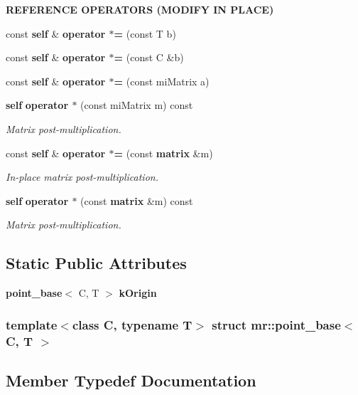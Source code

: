 \begin{Indent}{\bf REFERENCE OPERATORS (MODIFY IN PLACE)}\par
\begin{CompactItemize}
\item 
const {\bf self} \& {\bf operator $\ast$=} (const T b)
\item 
const {\bf self} \& {\bf operator $\ast$=} (const C \&b)
\item 
const {\bf self} \& {\bf operator $\ast$=} (const mi\-Matrix a)
\item 
{\bf self} {\bf operator $\ast$} (const mi\-Matrix m) const 
\begin{CompactList}\small\item\em Matrix post-multiplication. \item\end{CompactList}\item 
const {\bf self} \& {\bf operator $\ast$=} (const {\bf matrix} \&m)
\begin{CompactList}\small\item\em In-place matrix post-multiplication. \item\end{CompactList}\item 
{\bf self} {\bf operator $\ast$} (const {\bf matrix} \&m) const 
\begin{CompactList}\small\item\em Matrix post-multiplication. \item\end{CompactList}\end{CompactItemize}
\end{Indent}
\subsection*{Static Public Attributes}
\begin{CompactItemize}
\item 
{\bf point\_\-base}$<$ C, T $>$ {\bf k\-Origin}
\end{CompactItemize}
\subsubsection*{template$<$class C, typename T$>$ struct mr::point\_\-base$<$ C, T $>$}



\subsection{Member Typedef Documentation}
